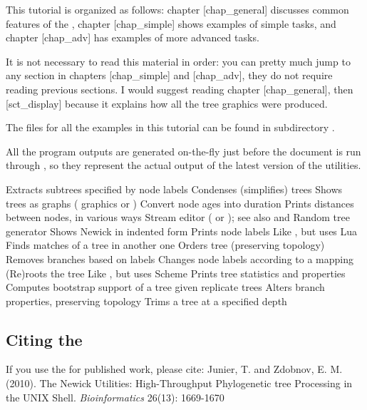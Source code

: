 This tutorial is organized as follows: chapter \in{}[chap_general] discusses
common features of the \nutils, chapter \in{}[chap_simple] shows examples of
simple tasks, and chapter \in{}[chap_adv] has examples of more advanced tasks. 

It is not necessary to read this material in order: you can pretty much jump to
any section in chapters \in{}[chap_simple] and \in{}[chap_adv], they do not
require reading previous sections. I would suggest reading chapter
\in{}[chap_general], then [sct_display] because it explains how all
the tree graphics were produced.

The files for all the examples in this tutorial can be found in
subdirectory .

All the program outputs are generated on-the-fly just before the document is run
through \ConTeXt{}, so they represent the actual output of the latest version of
the utilities.

\starttabulate[|l|l|]
  \MR
\HL
\NC \clade		\NC	Extracts subtrees specified by node labels \NC\MR
\NC \condense	\NC	Condenses (simplifies) trees \MR
\NC \display	\NC	Shows trees as graphs (\ascii{} graphics or \svg) \MR
\NC \duration	\NC	Convert node ages into duration \MR
\NC \distance	\NC	Prints distances between nodes, in various ways \MR
\NC \ed				\NC	Stream editor (  or ); see also \luaed{} and \sched \MR
\NC \gen			\NC	Random tree generator \MR
\NC \nwindent	\NC	Shows Newick in indented form \MR 
\NC {}		\NC	Prints node labels \MR
\NC \luaed				\NC	Like \ed, but uses Lua\MR
\NC \match		\NC	Finds matches of a tree in another one \MR
\NC \order		\NC	Orders tree (preserving topology) \MR
\NC \prune		\NC	Removes branches based on labels \MR 
\NC \rename		\NC	Changes node labels according to a mapping \MR
\NC \reroot		\NC	(Re)roots the tree \MR
\NC \sched				\NC	Like \luaed, but uses Scheme\MR
\NC \stats		\NC	Prints tree statistics and properties \MR
\NC \support	\NC	Computes bootstrap support of a tree given replicate trees \MR
\NC \topology	\NC	Alters branch properties, preserving topology \MR
\NC \trim		\NC	Trims a tree at a specified depth \MR
\stoptabulate

\subsection{Citing the \nutils}

If you use the \nutils{} for published work, please cite:
\medskip
\startnarrower
Junier, T. and Zdobnov, E. M. (2010). The Newick Utilities: High-Throughput
Phylogenetic tree Processing in the UNIX Shell. {\it Bioinformatics} 26(13):
1669-1670
\stopnarrower


